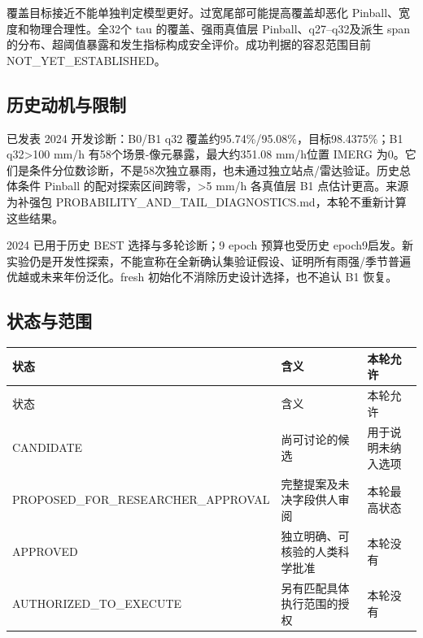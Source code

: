 \documentclass[UTF8,fontset=fandol,10pt]{ctexart}
\begin{document}
覆盖目标接近不能单独判定模型更好。过宽尾部可能提高覆盖却恶化 Pinball、宽度和物理合理性。全32个 tau 的覆盖、强雨真值层 Pinball、q27–q32及派生 span 的分布、超阈值暴露和发生指标构成安全评价。成功判据的容忍范围目前 NOT\_\allowbreak{}YET\_\allowbreak{}ESTABLISHED。

\subsection{历史动机与限制}

已发表 2024 开发诊断：B0/\allowbreak{}B1 q32 覆盖约95.74\%/\allowbreak{}95.08\%，目标98.4375\%；B1 q32>100 mm/\allowbreak{}h 有58个场景-像元暴露，最大约351.08 mm/\allowbreak{}h位置 IMERG 为0。它们是条件分位数诊断，不是58次独立暴雨，也未通过独立站点/\allowbreak{}雷达验证。历史总体条件 Pinball 的配对探索区间跨零，>5 mm/\allowbreak{}h 各真值层 B1 点估计更高。来源为补强包 PROBABILITY\_\allowbreak{}AND\_\allowbreak{}TAIL\_\allowbreak{}DIAGNOSTICS.md，本轮不重新计算这些结果。

2024 已用于历史 BEST 选择与多轮诊断；9 epoch 预算也受历史 epoch9启发。新实验仍是开发性探索，不能宣称在全新确认集验证假设、证明所有雨强/\allowbreak{}季节普遍优越或未来年份泛化。fresh 初始化不消除历史设计选择，也不追认 B1 恢复。

\subsection{状态与范围}

\begingroup\small\setlength{\tabcolsep}{3pt}\renewcommand{\arraystretch}{1.12}
\begin{longtable}{>{\raggedright\arraybackslash}p{\dimexpr(\linewidth-6\tabcolsep)/3\relax}>{\raggedright\arraybackslash}p{\dimexpr(\linewidth-6\tabcolsep)/3\relax}>{\raggedright\arraybackslash}p{\dimexpr(\linewidth-6\tabcolsep)/3\relax}}
\toprule
状态 & 含义 & 本轮允许 \\
\midrule\endfirsthead
状态 & 含义 & 本轮允许 \\
\midrule\endhead
CANDIDATE & 尚可讨论的候选 & 用于说明未纳入选项 \\
PROPOSED\_\allowbreak{}FOR\_\allowbreak{}RESEARCHER\_\allowbreak{}APPROVAL & 完整提案及未决字段供人审阅 & 本轮最高状态 \\
APPROVED & 独立明确、可核验的人类科学批准 & 本轮没有 \\
AUTHORIZED\_\allowbreak{}TO\_\allowbreak{}EXECUTE & 另有匹配具体执行范围的授权 & 本轮没有 \\
\bottomrule\end{longtable}\endgroup
\end{document}

